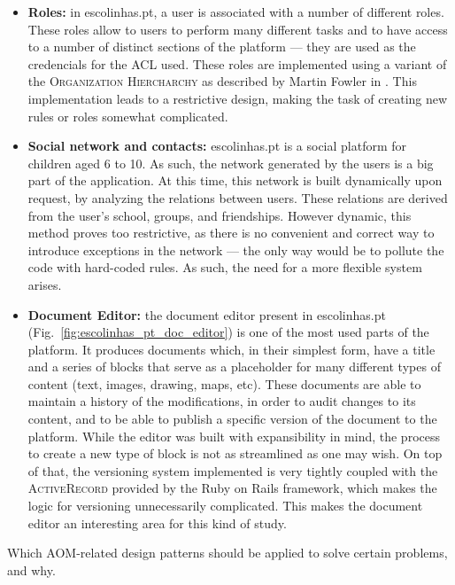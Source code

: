 \begin{itemize}
  \item \textbf{Roles:} in escolinhas.pt, a user is associated with a number of different roles. These roles allow to users to perform many different tasks and to have access to a number of distinct sections of the platform --- they are used as the credencials for the ACL used. These roles are implemented using a variant of the \textsc{Organization Hiercharchy} as described by Martin Fowler in \cite{fowler_organization_hierarchy}. This implementation leads to a restrictive design, making the task of creating new rules or roles somewhat complicated. \\
  
  \item \textbf{Social network and contacts:} escolinhas.pt is a social platform for children aged 6 to 10. As such, the network generated by the users is a big part of the application. At this time, this network is built dynamically upon request, by analyzing the relations between users. These relations are derived from the user's school, groups, and friendships. However dynamic, this method proves too restrictive, as there is no convenient and correct way to introduce exceptions in the network --- the only way would be to pollute the code with hard-coded rules. As such, the need for a more flexible system arises. \\
  
  \item \textbf{Document Editor:} the document editor present in escolinhas.pt (Fig.~\ref{fig:escolinhas_pt_doc_editor}) is one of the most used parts of the platform. It produces documents which, in their simplest form, have a title and a series of blocks that serve as a placeholder for many different types of content (text, images, drawing, maps, etc). These documents are able to maintain a history of the modifications, in order to audit changes to its content, and to be able to publish a specific version of the document to the platform. While the editor was built with expansibility in mind, the process to create a new type of block is not as streamlined as one may wish. On top of that, the versioning system implemented is very tightly coupled with the \textsc{ActiveRecord} provided by the Ruby on Rails framework, which makes the logic for versioning unnecessarily complicated. This makes the document editor an interesting area for this kind of study. \\
\end{itemize}

Which AOM-related design patterns should be applied to solve certain problems, and why.

